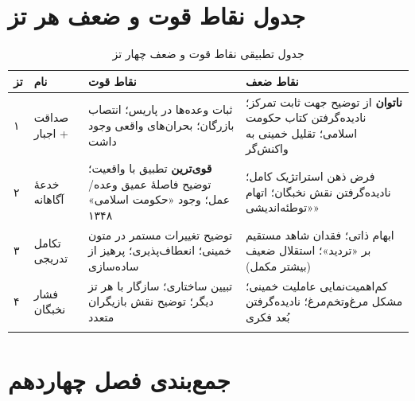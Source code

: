 \documentclass[12pt,a4paper]{book}
\newcommand{\keyword}[1]{\textbf{\textcolor{cPrimary}{#1}}}
\begin{document}
\section{جدول نقاط قوت و ضعف هر تز}

\begin{longtable}{%
    >{\centering\arraybackslash}p{}
    >{\raggedleft\arraybackslash}p{}
    >{\raggedleft\arraybackslash}p{}
    >{\raggedleft\arraybackslash}p{}}
\toprule
\rowcolor{cPrimary!10}
\textbf{تز} & \textbf{نام} & \textbf{نقاط قوت} & \textbf{نقاط ضعف} \\
\midrule
\endhead

\cellcolor{cGreen!10} ۱ &
\cellcolor{cGreen!10} صداقت + اجبار &
\cellcolor{cGreen!10} ثبات وعده‌ها در پاریس؛ انتصاب بازرگان؛ بحران‌های واقعی وجود داشت &
\cellcolor{cGreen!10} \keyword{ناتوان} از توضیح جهت ثابت تمرکز؛ نادیده‌گرفتن کتاب حکومت اسلامی؛ تقلیل خمینی به واکنش‌گر \\
\midrule

\cellcolor{cAccent!5} ۲ &
\cellcolor{cAccent!5} خدعهٔ آگاهانه &
\cellcolor{cAccent!5} \keyword{قوی‌ترین} تطبیق با واقعیت؛ توضیح فاصلهٔ عمیق وعده/عمل؛ وجود «حکومت اسلامی» ۱۳۴۸ &
\cellcolor{cAccent!5} فرض ذهن استراتژیک کامل؛ نادیده‌گرفتن نقش نخبگان؛ اتهام «توطئه‌اندیشی» \\
\midrule

\cellcolor{cGold!8} ۳ &
\cellcolor{cGold!8} تکامل تدریجی &
\cellcolor{cGold!8} توضیح تغییرات مستمر در متون خمینی؛ انعطاف‌پذیری؛ پرهیز از ساده‌سازی &
\cellcolor{cGold!8} ابهام ذاتی؛ فقدان شاهد مستقیم بر «تردید»؛ استقلال ضعیف (بیشتر مکمل) \\
\midrule

\cellcolor{cConsolid!5} ۴ &
\cellcolor{cConsolid!5} فشار نخبگان &
\cellcolor{cConsolid!5} تبیین ساختاری؛ سازگار با هر تز دیگر؛ توضیح نقش بازیگران متعدد &
\cellcolor{cConsolid!5} کم‌اهمیت‌نمایی عاملیت خمینی؛ مشکل مرغ‌وتخم‌مرغ؛ نادیده‌گرفتن بُعد فکری \\

\bottomrule
\caption{جدول تطبیقی نقاط قوت و ضعف چهار تز}
\label{tab:strengths-weaknesses}
\end{longtable}

\section{جمع‌بندی فصل چهاردهم}
\end{document}
